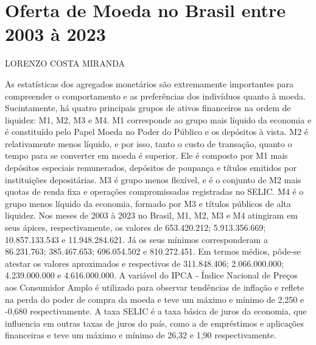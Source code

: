 \documentclass[12pt]{article}
\author{Lorenzo Costa Miranda}
\date{} %
\begin{document}
\section*{Oferta de Moeda no Brasil entre 2003 à 2023}
\hspace{4.5cm} LORENZO COSTA MIRANDA
\vspace*{5pt}

As estatísticas dos agregados monetários são extremamente importantes para compreender o comportamento e as preferências dos indivíduos quanto à moeda. Sucintamente, há quatro principais grupos de ativos financeiros na ordem de liquidez: M1, M2, M3 e M4. M1 corresponde ao grupo mais líquido da economia e é constituído pelo Papel Moeda no Poder do Público e os depósitos à vista. M2 é relativamente menos líquido, e por isso, tanto o custo de transação, quanto o tempo para se converter em moeda é superior. Ele é composto por M1 mais depósitos especiais remunerados, depósitos de poupança e títulos emitidos por instituições depositárias. M3 é grupo menos flexível, e é o conjunto de M2 mais quotas de renda fixa e operações compromissadas registradas no SELIC. M4 é o grupo menos líquido da economia, formado por M3 e títulos públicos de alta liquidez. Nos meses de 2003 à 2023 no Brasil, M1, M2, M3 e M4 atingiram em seus ápices, respectivamente, os valores de 653.420.212; 5.913.356.669; 10.857.133.543 e 11.948.284.621. Já os seus mínimos corresponderam a 86.231.763; 385.467.653; 696.054.502 e 810.272.451. Em termos médios, pôde-se atestar os valores aproximados e respectivos de 311.848.406; 2.066.000.000; 4.239.000.000 e 4.616.000.000. A variável do IPCA - Índice Nacional de Preços aos Consumidor Amplo é utilizado para observar tendências de inflação e reflete na perda do poder de compra da moeda e teve um máximo e mínimo de 2,250 e -0,680 respectivamente. A taxa SELIC é a taxa básica de juros da economia, que influencia em outras taxas de juros do país, como a de empréstimos e aplicações financeiras e teve um máximo e mínimo de 26,32 e 1,90 respectivamente. 
\end{document}
